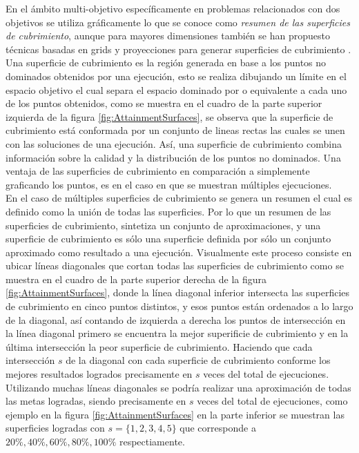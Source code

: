 En el ámbito multi-objetivo específicamente en problemas relacionados con dos objetivos se utiliza gráficamente lo que se conoce como \textit{resumen de las superficies de cubrimiento}, aunque para mayores dimensiones también se han propuesto técnicas basadas en grids y proyecciones para generar superficies de cubrimiento \citep{Joel:AttainmentSurface}.
%
Una superficie de cubrimiento es la región generada en base a los puntos no dominados obtenidos por una ejecución, esto se realiza dibujando un límite en el espacio objetivo el cual separa el espacio dominado por o equivalente a cada uno de los puntos obtenidos, como se muestra en el cuadro de la parte superior izquierda de la figura  \ref{fig:AttainmentSurfaces}, se observa que la superficie de cubrimiento está conformada por un conjunto de lineas rectas las cuales se unen con las soluciones de una ejecución.
%
Así, una superficie de cubrimiento combina información sobre la calidad y la distribución de los puntos no dominados.
%
Una ventaja de las superficies de cubrimiento en comparación a simplemente graficando los puntos, es en el caso en que se muestran múltiples ejecuciones.\\
%
En el caso de múltiples superficies de cubrimiento se genera un resumen el cual es definido como la unión de todas las superficies.
%
Por lo que un resumen de las superficies de cubrimiento, sintetiza un conjunto de aproximaciones, y una superficie de cubrimiento es sólo una superficie definida por sólo un conjunto aproximado como resultado a una ejecución.
%
Visualmente este proceso consiste en ubicar líneas diagonales que cortan todas las superficies de cubrimiento como se muestra en el cuadro de la parte superior derecha de la figura \ref{fig:AttainmentSurfaces}, donde la línea diagonal inferior intersecta las superficies de cubrimiento en cinco puntos distintos, y esos puntos están ordenados a lo largo de la diagonal, así contando de izquierda a derecha los puntos de intersección en la línea diagonal primero se encuentra la mejor superificie de cubrimiento y en la última intersección la peor superficie de cubrimiento. 
%
Haciendo que cada intersección $s$ de la diagonal  con cada superficie de cubrimiento conforme los mejores resultados logrados precisamente en $s$ veces del total de ejecuciones. 
%
Utilizando muchas líneas diagonales se podría realizar una aproximación de todas las metas logradas, siendo precisamente en $s$ veces del total de ejecuciones, como ejemplo en la figura \ref{fig:AttainmentSurfaces} en la parte inferior se muestran las superficies logradas con $s= \{1, 2, 3, 4, 5\}$ que corresponde a $20\%, 40\%, 60\%, 80\%, 100\% $ respectiamente.

